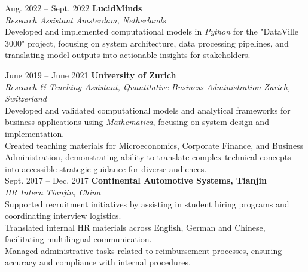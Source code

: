 \documentclass[a4paper,12pt]{article}
\makeatletter
\newenvironment{jobshort}[2]
    {
    \begin{tabularx}{\linewidth}{@{}l X r@{}}
    \textbf{#1} & \hfill &  #2 \\[3.75pt]
    \end{tabularx}
    }
    {
    }
\makeatother
\begin{document}
Aug. 2022 -- Sept. 2022 \hfill \textbf{LucidMinds} \\ %
\textit{Research Assistant} \hfill \textit{Amsterdam, Netherlands} \\
\textbullet Developed and implemented computational models in \textit{Python} for the "DataVille 3000" project, focusing on system architecture, data processing pipelines, and translating model outputs into actionable insights for stakeholders.

June 2019 -- June 2021 \hfill \textbf{University of Zurich} \\
\textit{Research \& Teaching Assistant, Quantitative Business Administration} \hfill \textit{Zurich, Switzerland} \\
\textbullet Developed and validated computational models and analytical frameworks for business applications using \textit{Mathematica}, focusing on system design and implementation. \\
\textbullet Created teaching materials for Microeconomics, Corporate Finance, and Business Administration, demonstrating ability to translate complex technical concepts into accessible strategic guidance for diverse audiences. \\


Sept. 2017 -- Dec. 2017 \hfill \textbf{Continental Automotive Systems, Tianjin} \\
\textit{HR Intern} \hfill \textit{Tianjin, China} \\
\textbullet Supported recruitment initiatives by assisting in student hiring programs and coordinating interview logistics. \\
\textbullet Translated internal HR materials across English, German and Chinese, facilitating multilingual communication. \\
\textbullet Managed administrative tasks related to reimbursement processes, ensuring accuracy and compliance with internal procedures. \\
\end{document}
